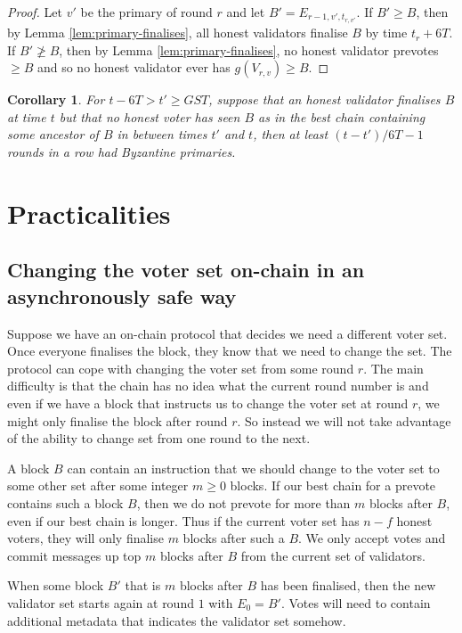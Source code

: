 \documentclass{article}
\newtheorem{corollary}[theorem]{Corollary}
\begin{document}
{\begin{proof} Let $v'$ be the primary of round $r$ and let $B'=E_{r-1,v',t_{r,v'}}$. If $B' \geq B$, then by Lemma \ref{lem:primary-finalises}, all honest validators finalise $B$ by time $t_r+6T$. If $B' \not\geq B$, then by Lemma \ref{lem:primary-finalises}, no honest validator prevotes $\geq B$ and so no honest validator ever has $g(V_{r,v}) \geq B$.
\end{proof}


\begin{corollary} For $t - 6T > t' \geq GST$, suppose that an honest validator finalises $B$ at time $t$ but that no honest voter has seen $B$ as in the best chain containing some ancestor of $B$ in between times $t'$ and $t$, then at least $(t-t')/6T - 1$ rounds in a row had Byzantine primaries. \end{corollary}




\section{Practicalities}

\subsection{Changing the voter set on-chain in an asynchronously safe way}

Suppose we have an on-chain protocol that decides we need a different voter set. Once everyone finalises the block, they know that we need to change the set. The protocol can cope with changing the voter set from some round $r$. The main difficulty is that the chain has no idea what the current round number is and even if we have a block that instructs us to change the voter set at round $r$, we might only finalise the block after round $r$. So instead we will not take advantage of the ability to change set from one round to the next. 

A block $B$ can contain an instruction that we should change to the voter set to some other set after some integer $m \geq 0$ blocks. If our best chain for a prevote contains such a block $B$, then we do not prevote for more than $m$ blocks after $B$, even if our best chain is longer. Thus if the current voter set has $n-f$ honest voters, they will only finalise $m$ blocks after such a $B$. We only accept votes and commit messages up top $m$ blocks after $B$ from the current set of validators.  

When some block $B'$ that is $m$ blocks after $B$ has been finalised, then the new validator set starts again at round $1$ with $E_{0}=B'$. Votes will need to contain additional metadata that indicates the validator set somehow.

}
\end{document}
